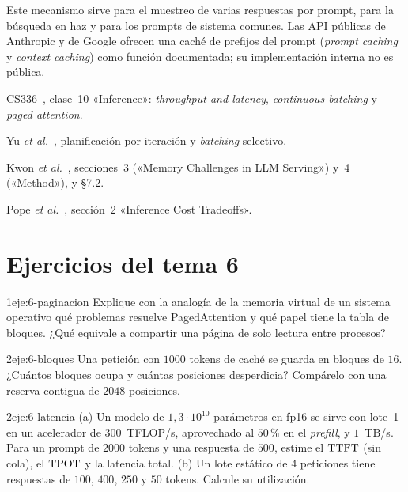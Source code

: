 Este mecanismo sirve para el muestreo de varias respuestas por prompt, para la búsqueda en haz y para los prompts de sistema comunes. Las API públicas de Anthropic y de Google ofrecen una caché de prefijos del prompt (\emph{prompt caching} y \emph{context caching}) como función documentada; su implementación interna no es pública.

\begin{lecturas}
\item CS336~\cite{cs336}, clase~10 «Inference»: \emph{throughput and latency}, \emph{continuous batching} y \emph{paged attention}.
\item Yu \emph{et al.}~\cite{orca}, planificación por iteración y \emph{batching} selectivo.
\item Kwon \emph{et al.}~\cite{kwon}, secciones~3 («Memory Challenges in LLM Serving») y~4 («Method»), y §7.2.
\item Pope \emph{et al.}~\cite{pope}, sección~2 «Inference Cost Tradeoffs».
\end{lecturas}

\section*{Ejercicios del tema 6}

\begin{ejercicio}{1}{eje:6-paginacion}
Explique con la analogía de la memoria virtual de un sistema operativo qué problemas resuelve PagedAttention y qué papel tiene la tabla de bloques. ¿Qué equivale a compartir una página de solo lectura entre procesos?
\end{ejercicio}

\begin{ejercicio}{2}{eje:6-bloques}
Una petición con $1000$ tokens de caché se guarda en bloques de $16$. ¿Cuántos bloques ocupa y cuántas posiciones desperdicia? Compárelo con una reserva contigua de $2048$ posiciones.
\end{ejercicio}

\begin{ejercicio}{2}{eje:6-latencia}
(a) Un modelo de $1{,}3\cdot 10^{10}$ parámetros en fp16 se sirve con lote~1 en un acelerador de $300$~TFLOP/s, aprovechado al $50\,\%$ en el \emph{prefill}, y $1$~TB/s. Para un prompt de $2000$ tokens y una respuesta de $500$, estime el $\mathrm{TTFT}$ (sin cola), el $\mathrm{TPOT}$ y la latencia total. (b) Un lote estático de 4 peticiones tiene respuestas de $100$, $400$, $250$ y $50$ tokens. Calcule su utilización.
\end{ejercicio}

